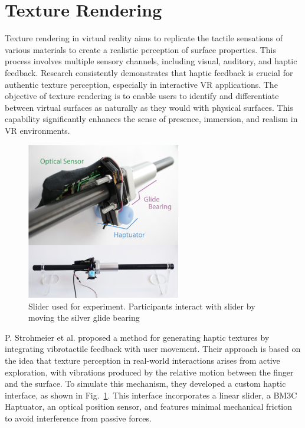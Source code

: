 \section{Texture Rendering}
Texture rendering in virtual reality aims to replicate the tactile sensations of various materials to create a realistic perception of surface properties. This process involves multiple sensory channels, including visual, auditory, and haptic feedback. Research consistently demonstrates that haptic feedback is crucial for authentic texture perception, especially in interactive VR applications. The objective of texture rendering is to enable users to identify and differentiate between virtual surfaces as naturally as they would with physical surfaces. This capability significantly enhances the sense of presence, immersion, and realism in VR environments.
\begin{figure}[H]\centering
	\includegraphics[width=0.6\textwidth]{Pictures/Texture_Rendering_1.png}%
	\caption{Slider used for experiment. Participants interact with slider by moving the silver glide bearing\cite{10.1145/3025453.3025812}}\label{fig:Texture_Rendering_1}%
\end{figure}

P. Strohmeier et al.\cite{10.1145/3025453.3025812} proposed a method for generating haptic textures by integrating vibrotactile feedback with user movement. Their approach is based on the idea that texture perception in real-world interactions arises from active exploration, with vibrations produced by the relative motion between the finger and the surface. To simulate this mechanism, they developed a custom haptic interface, as shown in Fig.~\ref{fig:Texture_Rendering_1}. This interface incorporates a linear slider, a BM3C Haptuator, an optical position sensor, and features minimal mechanical friction to avoid interference from passive forces.

